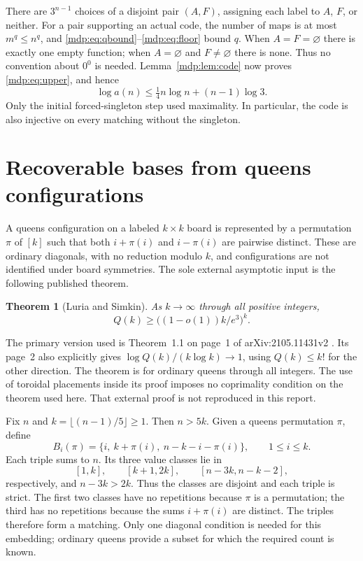 \documentclass[11pt,letterpaper]{article}
\numberwithin{equation}{section}
\newtheorem{theorem}{Theorem}[section]
\theoremstyle{remark}\newtheorem{remark}[theorem]{Remark}
\begin{document}
There are $3^{n-1}$ choices of a disjoint pair $(A,F)$, assigning each
label to $A$, $F$, or neither. For a pair supporting an actual code,
the number of maps is at most $m^q\le n^q$, and
\eqref{mdp:eq:qbound}--\eqref{mdp:eq:floor} bound $q$. When $A=F=\varnothing$
there is exactly one empty function; when $A=\varnothing$ and
$F\ne\varnothing$ there is none. Thus no convention about $0^0$ is
needed. Lemma~\ref{mdp:lem:code} now proves \eqref{mdp:eq:upper}, and hence
\begin{equation}\label{mdp:eq:logupper}
 \log a(n)\le\tfrac14n\log n+(n-1)\log3.
\end{equation}
Only the initial forced-singleton step used maximality. In particular,
the code is also injective on every matching without the singleton.

\section{Recoverable bases from queens configurations}\label{mdp:sec:queens}
A queens configuration on a labeled $k\times k$ board is represented by
a permutation $\pi$ of $[k]$ such that both $i+\pi(i)$ and $i-\pi(i)$
are pairwise distinct. These are ordinary diagonals, with no reduction
modulo $k$, and configurations are not identified under board symmetries.
The sole external asymptotic input is the following published theorem.

\begin{theorem}[Luria and Simkin]\label{mdp:thm:queens}
As $k\to\infty$ through all positive integers,
\begin{equation}\label{mdp:eq:queens}
 Q(k)\ge \bigl((1-o(1))k/e^3\bigr)^k.
\end{equation}
\end{theorem}
The primary version used is Theorem~1.1 on page~1 of
arXiv:2105.11431v2 \cite{queens}. Its page~2 also explicitly gives
$\log Q(k)/(k\log k)\to1$, using $Q(k)\le k!$ for the other direction.
The theorem is for ordinary queens through all integers. The use of
toroidal placements inside its proof imposes no coprimality condition
on the theorem used here. That external proof is not reproduced in
this report.

Fix $n$ and $k=\lfloor(n-1)/5\rfloor\ge1$. Then $n>5k$. Given a
queens permutation $\pi$, define
\begin{equation}\label{mdp:eq:triples}
 B_i(\pi)=\{i,\ k+\pi(i),\ n-k-i-\pi(i)\},
 \qquad 1\le i\le k.
\end{equation}
Each triple sums to $n$. Its three value classes lie in
\[
 [1,k],\qquad[k+1,2k],\qquad[n-3k,n-k-2],
\]
respectively, and $n-3k>2k$. Thus the classes are disjoint and each
triple is strict. The first two classes have no repetitions because
$\pi$ is a permutation; the third has no repetitions because the sums
$i+\pi(i)$ are distinct. The triples therefore form a matching.
Only one diagonal condition is needed for this embedding; ordinary
queens provide a subset for which the required count is known.
\end{document}
